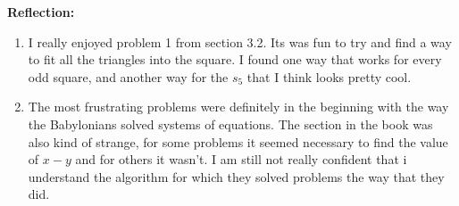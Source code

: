 \documentclass[12pt]{article}
\theoremstyle{homework}
\begin{document}
\textbf{Reflection:}
\begin{enumerate}
\item I really enjoyed problem 1 from section 3.2. Its was fun to try and find a way to fit all the triangles into the square. I found one way
that works for every odd square, and another way for the $s_5$ that I think looks pretty cool. \\

\item The most frustrating problems were definitely in the beginning with the way the Babylonians solved systems of equations. The section in the book was also 
kind of strange, for some problems it seemed necessary to find the value of $x-y$ and for others it wasn't. I am still not really confident that i understand the algorithm for which they solved 
problems the way that they did. 
\end{enumerate}
\end{document}
